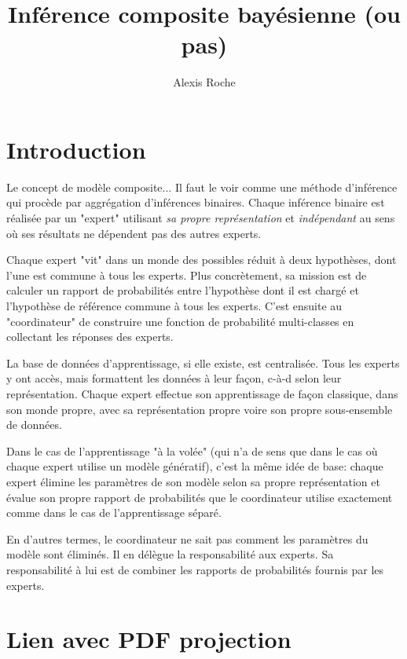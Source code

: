 \documentclass{article}
\title{Inf\'erence composite bay\'esienne (ou pas)}
\author{Alexis Roche}
\begin{document}
\maketitle

\section{Introduction}

Le concept de mod\`ele composite... Il faut le voir comme une m\'ethode d'inf\'erence qui proc\`ede par aggr\'egation d'inf\'erences binaires. Chaque inf\'erence binaire est r\'ealis\'ee par un "expert" utilisant {\em sa propre repr\'esentation} et {\em ind\'ependant} au sens o\`u ses r\'esultats ne d\'ependent pas des autres experts. 

Chaque expert "vit" dans un monde des possibles r\'eduit \`a deux hypoth\`eses, dont l'une est commune \`a tous les experts. Plus concr\`etement, sa mission est de calculer un rapport de probabilit\'es entre l'hypoth\`ese dont il est charg\'e et l'hypoth\`ese de r\'ef\'erence commune \`a tous les experts. C'est ensuite au "coordinateur" de construire une fonction de probabilit\'e multi-classes en collectant les r\'eponses des experts. 

La base de donn\'ees d'apprentissage, si elle existe, est centralis\'ee. Tous les experts y ont acc\`es, mais formattent les donn\'ees \`a leur fa\c{c}on, c-\`a-d selon leur repr\'esentation. Chaque expert effectue son apprentissage de fa\c{c}on classique, dans son monde propre, avec sa repr\'esentation propre voire son propre sous-ensemble de donn\'ees. 

Dans le cas de l'apprentissage "\`a la vol\'ee" (qui n'a de sens que dans le cas o\`u chaque expert utilise un mod\`ele g\'en\'eratif), c'est la m\^eme id\'ee de base: chaque expert \'elimine les param\`etres de son mod\`ele selon sa propre repr\'esentation et \'evalue son propre rapport de probabilit\'es que le coordinateur utilise exactement comme dans le cas de l'apprentissage s\'epar\'e. 

En d'autres termes, le coordinateur ne sait pas comment les param\`etres du mod\`ele sont \'elimin\'es. Il en d\'el\`egue la responsabilit\'e aux experts. Sa responsabilit\'e \`a lui est de combiner les rapports de probabilit\'es fournis par les experts. 


\section{Lien avec PDF projection}
\end{document}
